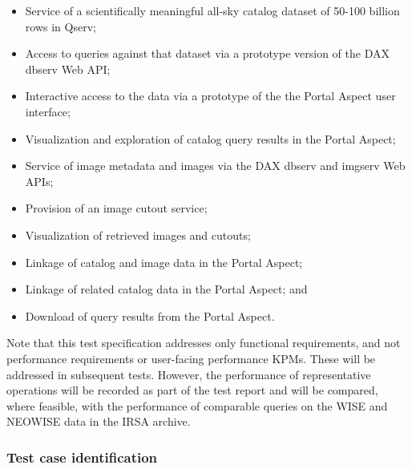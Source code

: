 \begin{itemize}
\item{Service of a scientifically meaningful all-sky catalog dataset of 50-100 billion rows in Qserv;}
\item{Access to queries against that dataset via a prototype version of the DAX dbserv Web API;}
\item{Interactive access to the data via a prototype of the the Portal Aspect user interface;}
\item{Visualization and exploration of catalog query results in the Portal Aspect;}
\item{Service of image metadata and images via the DAX dbserv and imgserv Web APIs;}
\item{Provision of an image cutout service;}
\item{Visualization of retrieved images and cutouts;}
\item{Linkage of catalog and image data in the Portal Aspect;}
\item{Linkage of related catalog data in the Portal Aspect; and}
\item{Download of query results from the Portal Aspect.}
\end{itemize}

Note that this test specification addresses only functional requirements, and not performance requirements or user-facing performance KPMs.
These will be addressed in subsequent tests.
However, the performance of representative operations will be recorded as part of the test report and will be compared, where feasible, with the performance of comparable queries on the WISE and NEOWISE data in the IRSA archive.

\subsubsection{Test case identification}

